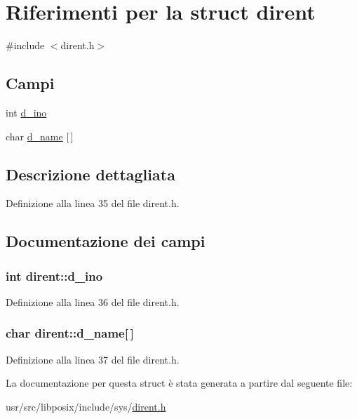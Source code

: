 \hypertarget{structdirent}{\section{Riferimenti per la struct dirent}
\label{structdirent}
}


{\ttfamily \#include $<$dirent.\+h$>$}

\subsection*{Campi}
\begin{DoxyCompactItemize}
\item 
int \hyperlink{structdirent_aef01e92a29cba347e6e6a5f22d4908a2}{d\+\_\+ino}
\item 
char \hyperlink{structdirent_a39a9af609c1808f0bdf90155bd3f55ed}{d\+\_\+name} \mbox{[}$\,$\mbox{]}
\end{DoxyCompactItemize}


\subsection{Descrizione dettagliata}


Definizione alla linea 35 del file dirent.\+h.



\subsection{Documentazione dei campi}
\hypertarget{structdirent_aef01e92a29cba347e6e6a5f22d4908a2}{
\subsubsection[{d\+\_\+ino}]{\setlength{\rightskip}{0pt plus 5cm}int dirent\+::d\+\_\+ino}}\label{structdirent_aef01e92a29cba347e6e6a5f22d4908a2}


Definizione alla linea 36 del file dirent.\+h.

\hypertarget{structdirent_a39a9af609c1808f0bdf90155bd3f55ed}{
\subsubsection[{d\+\_\+name}]{\setlength{\rightskip}{0pt plus 5cm}char dirent\+::d\+\_\+name\mbox{[}$\,$\mbox{]}}}\label{structdirent_a39a9af609c1808f0bdf90155bd3f55ed}


Definizione alla linea 37 del file dirent.\+h.



La documentazione per questa struct è stata generata a partire dal seguente file\+:\begin{DoxyCompactItemize}
\item 
usr/src/libposix/include/sys/\hyperlink{dirent_8h}{dirent.\+h}\end{DoxyCompactItemize}
